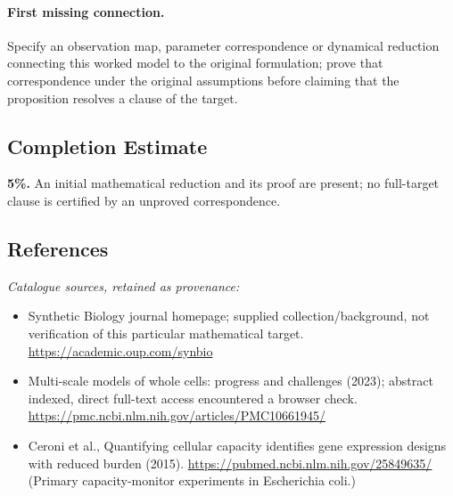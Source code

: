 \documentclass[11pt]{article}
\begin{document}
\paragraph{First missing connection.} Specify an observation map, parameter correspondence or dynamical reduction connecting this worked model to the original formulation; prove that correspondence under the original assumptions before claiming that the proposition resolves a clause of the target.
\subsection{Completion Estimate}
\textbf{5\%.} An initial mathematical reduction and its proof are present; no full-target clause is certified by an unproved correspondence.
\subsection{References}
\noindent\emph{Catalogue sources, retained as provenance:}
\begin{itemize}
\item Synthetic Biology journal homepage; supplied collection/background, not verification of this particular mathematical target. \url{https://academic.oup.com/synbio}
\item Multi-scale models of whole cells: progress and challenges (2023); abstract indexed, direct full-text access encountered a browser check. \url{https://pmc.ncbi.nlm.nih.gov/articles/PMC10661945/}
\item Ceroni et al., Quantifying cellular capacity identifies gene expression designs with reduced burden (2015). \url{https://pubmed.ncbi.nlm.nih.gov/25849635/} (Primary capacity-monitor experiments in Escherichia coli.)
\end{itemize}
\end{document}
